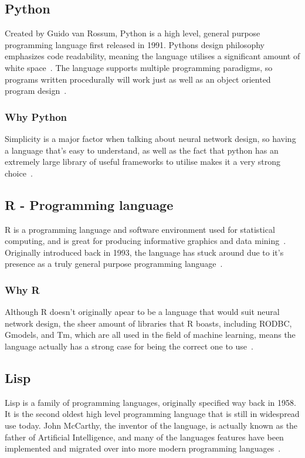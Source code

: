 \subsection{Python}
Created by Guido van Rossum, Python is a high level, general purpose programming language first released in 1991. Pythons design philosophy emphasizes code readability, meaning the language utilises a significant amount of white space~\cite{whatIsPython}. The language supports multiple programming paradigms, so programs written procedurally will work just as well as an object oriented program design~\cite{pedregosa2011scikit}.

\subsubsection{Why Python} 
Simplicity is a major factor when talking about neural network design, so having a language that's easy to understand, as well as the fact that python has an extremely large library of useful frameworks to utilise makes it a very strong choice~\cite{whatIsPythonForBeginners}.

\subsection{R - Programming language}
R is a programming language and software environment used for statistical computing, and is great for producing informative graphics and data mining~\cite{rAbout}. Originally introduced back in 1993, the language has stuck around due to it's presence as a truly general purpose programming language~\cite{hornik2009open}.

\subsubsection{Why R}
Although R doesn't originally apear to be a language that would suit neural network design, the sheer amount of libraries that R boasts, including RODBC, Gmodels, and Tm, which are all used in the field of machine learning, means the language actually has a strong case for being the correct one to use~\cite{rIntroAndBasics}.

\subsection{Lisp}
Lisp is a family of programming languages, originally specified way back in 1958. It is the second oldest high level programming language that is still in widespread use today. John McCarthy, the inventor of the language, is actually known as the father of Artificial Intelligence, and many of the languages features have been implemented and migrated over into more modern programming languages~\cite{LISPIntro}.

